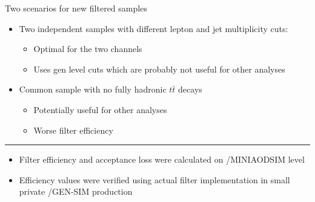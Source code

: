 \documentclass{beamer}
\begin{document}
\begin{frame}{Two scenarios for new filtered samples}
\begin{itemize}
\item Two independent samples with different lepton and jet multiplicity cuts:
\begin{itemize}
\item Optimal for the two channels
\item Uses gen level cuts which are probably not useful for other analyses
\end{itemize}
\vspace{10pt}
\item Common sample with no fully hadronic $t\bar{t}$ decays
\begin{itemize}
\item Potentially useful for other analyses
\item Worse filter efficiency
\end{itemize}
\end{itemize}
\vspace{25pt}
\hrule
\begin{itemize}
\item Filter efficiency and acceptance loss were calculated on /MINIAODSIM level
\item Efficiency values were verified using actual filter implementation in small private /GEN-SIM production
\end{itemize}
\end{frame}
\end{document}

